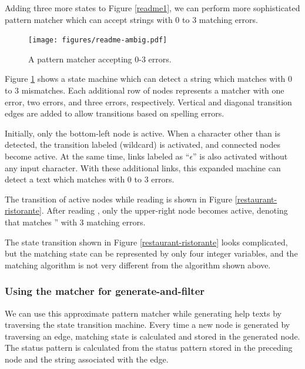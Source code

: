 \documentclass{sigchi}
\begin{document}
Adding three more states to Figure \ref{readme1}, we can perform more
sophisticated pattern matcher which can accept strings with
0 to 3 matching errors.

\begin{figure}[htb]
\texttt{[image: figures/readme-ambig.pdf]}
\caption{A pattern matcher accepting 0-3 errors.}
\label{shifterambig}
\end{figure}

Figure \ref{shifterambig} shows a state machine which can detect a string
which matches  with 0 to 3 mismatches.
Each additional row of nodes represents a matcher with one error,
two errors, and three errors, respectively.
Vertical and diagonal transition edges are added to allow
transitions based on spelling errors.

Initially, only the bottom-left node is active.
When a character other than  is detected, 
the transition labeled \sqsf{*} (wildcard) is activated,
and connected nodes become active.
At the same time, links labeled as ``$\epsilon$''
is also activated without any input character.
With these additional links, this expanded machine can detect a text which
matches  with 0 to 3 errors.


The transition of active nodes while reading
 is shown in Figure \ref{restaurant-ristorante}.
After reading ,
only the upper-right node becomes active,
denoting that  matches
'' with 3 matching errors.

The state transition shown in 
Figure \ref{restaurant-ristorante} looks complicated, but
the matching state can be represented by only four integer variables, and
the matching algorithm is not very different from the algorithm
shown above.

\subsubsection{Using the matcher for generate-and-filter}

We can use this approximate pattern matcher while generating
help texts by traversing the state transition machine.
%
Every time a new node is generated by traversing an edge,
matching state is calculated and stored in the generated node.
The status pattern is calculated from the status pattern
stored in the preceding node and the string associated with the edge.
\end{document}
